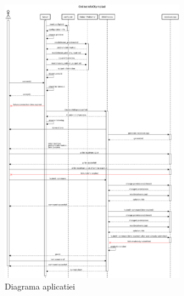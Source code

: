 \documentclass[runningheads]{llncs}
\begin{document}
\begin{figure}[h]
    \centering
    \includegraphics[width=0.7\textwidth]{OnlineInfoOlympiad.png}
    \caption{Diagrama aplicatiei}
    \label{fig:OnlineInfoOlympiad}
  \end{figure}
\end{document}
